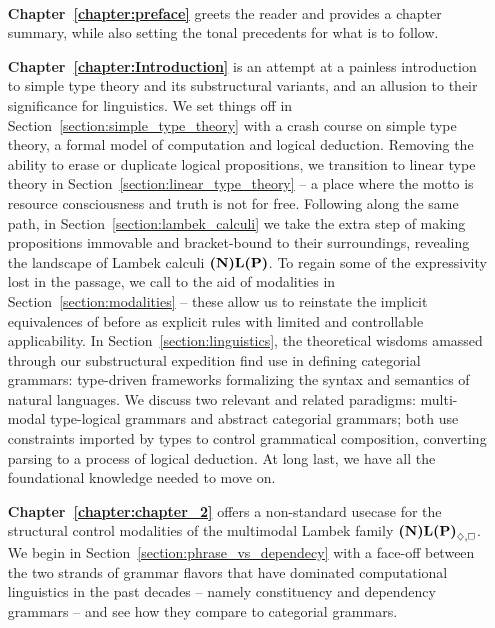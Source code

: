 {\paragraph{}
\begin{enumerate}[labelindent=2pt, itemindent=30pt, labelsep=5pt, widest=Chapter III,align=right,itemsep=5pt]
\item[\textbf{Chapter~\ref{chapter:preface}}] greets the reader and provides a chapter summary, while also setting the tonal precedents for what is to follow.
\item[\textbf{Chapter~\ref{chapter:Introduction}}] is an attempt at a painless introduction to simple type theory and its substructural variants, and an allusion to their significance for linguistics.
We set things off in Section~\ref{section:simple_type_theory} with a crash course on simple type theory, a formal model of computation and logical deduction.
Removing the ability to erase or duplicate logical propositions, we transition to linear type theory in Section~\ref{section:linear_type_theory} -- a place where the motto is resource consciousness and truth is not for free.
Following along the same path, in Section~\ref{section:lambek_calculi} we take the extra step of making propositions immovable and bracket-bound to their surroundings, revealing the landscape of Lambek calculi $\textbf{(N)L(P)}$.
To regain some of the expressivity lost in the passage, we call to the aid of modalities in Section~\ref{section:modalities} -- these allow us to reinstate the implicit equivalences of before as explicit rules with limited and controllable applicability.
In Section~\ref{section:linguistics}, the theoretical wisdoms amassed through our substructural expedition find use in defining categorial grammars: type-driven frameworks formalizing the syntax and semantics of natural languages.
We discuss two relevant and related paradigms: multi-modal type-logical grammars and abstract categorial grammars; both use constraints imported by types to control grammatical composition, converting parsing to a process of logical deduction.
At long last, we have all the foundational knowledge needed to move on.
\item[\textbf{Chapter~\ref{chapter:chapter_2}}] offers a non-standard usecase for the structural control modalities of the multimodal Lambek family $\logic{(N)L(P)}_{\diamond, \bx}$.
We begin in Section~\ref{section:phrase_vs_dependecy} with a face-off between the two strands of grammar flavors that have dominated computational linguistics in the past decades -- namely constituency  and dependency grammars -- and see how they compare to categorial grammars.

\end{enumerate}}
